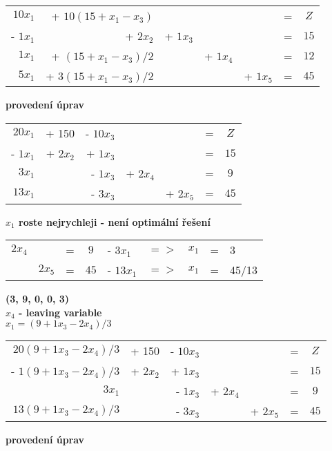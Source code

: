 \documentclass{article}%
\begin{document}
\begin{tabular}{rrrrrcc}
    $10x_1$   & + $10(15 + x_1 - x_3)$   &          &          &          & = & $Z$   \\
    - $1x_1$  & + $2x_2$                 & + $1x_3$    &          &          & = & $15$  \\
    $1x_1$    & + $(15 + x_1 - x_3)/2$   &          & + $1x_4$ &          & = & $12$  \\
    $5x_1$    & + $3(15 + x_1 - x_3)/2$  &          &          & + $1x_5$ & = & $45$  \\
\end{tabular}
\newline
\textbf{
    provedení úprav \\
}

\begin{tabular}{rrrrrcc}
    $20x_1$  & + 150    & - $10x_3$ &          &          & = & $Z$   \\
    - $1x_1$ & + $2x_2$ & + $1x_3$  &          &          & = & $15$  \\
    $3x_1$   &          & - $1x_3$  & + $2x_4$ &          & = & $9$  \\
    $13x_1$  &          & - $3x_3$  &          & + $2x_5$ & = & $45$  \\
\end{tabular}
\newline
\textbf{
    $x_1$ roste nejrychleji - není optimální řešení\\
}

\begin{tabular}{rrcclrrcl}
    $2x_4$  &  & =   & $9$  & - $3x_1$  & $=>$ & $x_1$ & = & 3 \\
    & $2x_5$   & =   & $45$ & - $13x_1$ & $=>$ & $x_1$ & = & 45/13 \\
\end{tabular}
\newline
\textbf{
    (3, 9, 0, 0, 3) \\
    $x_4$ - leaving variable \\
    $x_1 = (9 + 1x_3 - 2x_4)/3$ \\
}

\begin{tabular}{rrrrrcc}
    $20(9 + 1x_3 - 2x_4)/3$  & + 150    & - $10x_3$ &          &          & = & $Z$   \\
    - $1(9 + 1x_3 - 2x_4)/3$ & + $2x_2$ & + $1x_3$  &          &          & = & $15$  \\
    $3x_1$                   &          & - $1x_3$  & + $2x_4$ &          & = & $9$  \\
    $13(9 + 1x_3 - 2x_4)/3$  &          &  - $3x_3$ &          & + $2x_5$ & = & $45$  \\
\end{tabular}
\newline
\textbf{
    provedení úprav \\
}
\end{document}
